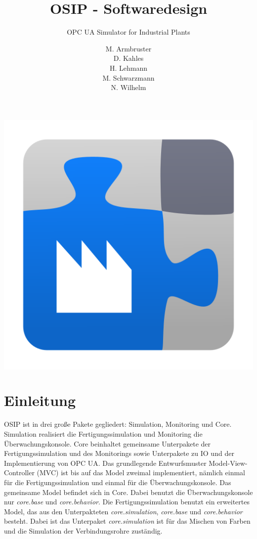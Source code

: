 \documentclass[parskip=full]{scrartcl}
\title{OSIP - Softwaredesign}
\subtitle{OPC UA Simulator for Industrial Plants}
\author{
    M. Armbruster\\
    D. Kahles\\
    H. Lehmann\\
    M. Schwarzmann\\
    N. Wilhelm
}
\begin{document}
\maketitle

\vspace{20px}
\begin{center}
  \includegraphics[scale=0.4]{../icon.png}
\end{center}
\pagebreak
\tableofcontents
\pagebreak

\section{Einleitung}
OSIP ist in drei große Pakete gegliedert: Simulation, Monitoring und Core.
Simulation realisiert die Fertigungssimulation und Monitoring die Überwachungskonsole.
Core beinhaltet gemeinsame Unterpakete der Fertigungssimulation und des Monitorings sowie Unterpakete zu IO und der Implementierung
von OPC UA.
Das grundlegende Entwurfsmuster Model-View-Controller (MVC) ist bis auf das Model zweimal implementiert, nämlich einmal für die
Fertigungssimulation und einmal für die Überwachungskonsole.
Das gemeinsame Model befindet sich in Core. Dabei benutzt die Überwachungskonsole nur \emph{core.base} und \emph{core.behavior}.
Die Fertigungssimulation benutzt ein erweitertes Model, das aus den Unterpakteten \emph{core.simulation}, \emph{core.base} und \emph{core.behavior} besteht.
Dabei ist das Unterpaket \emph{core.simulation} ist für das Mischen von Farben und die Simulation der Verbindungsrohre zuständig.
\end{document}
